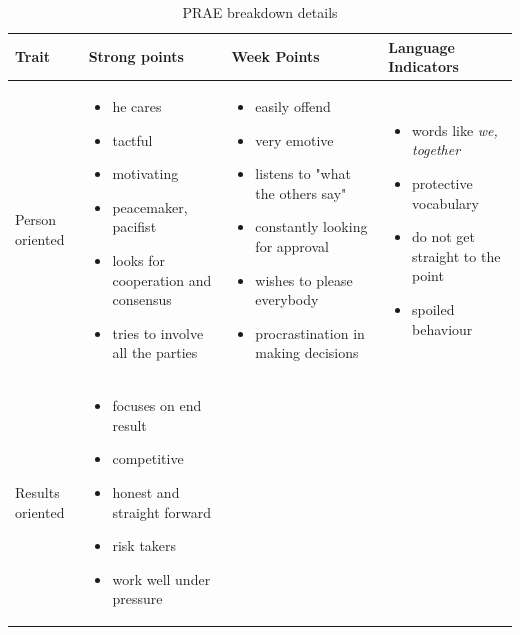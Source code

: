 \begin{table}[h]
  \centering
  \caption{PRAE breakdown details}
  \setlength\tabcolsep{3.8pt}
  \setlength\extrarowheight{1pt}
    \begin{tabular}{p{}p{}p{}p{}}
    \toprule
    Trait & Strong points & Week Points & Language Indicators \\ \midrule
    
    Person oriented 
     &
      \begin{itemize}
      \item he cares
      \item tactful
      \item motivating
      \item peacemaker, pacifist
      \item looks for cooperation and consensus
      \item tries to involve all the parties
      \end{itemize}
     & 
      \begin{itemize}
      \item easily offend
      \item very emotive
      \item listens to "what the others say"
      \item constantly looking for approval
      \item wishes to please everybody
      \item procrastination in making decisions
      \end{itemize}
     & 
      \begin{itemize}
      \item words like \textit{we, together}
      \item protective vocabulary
      \item do not get straight to the point
      \item spoiled behaviour
      \end{itemize}
     \\ \midrule
    Results oriented
     &
      \begin{itemize}
       \item focuses on end result
       \item competitive
       \item honest and straight forward
       \item risk takers
       \item work well under pressure

\end{itemize}
\end{tabular}
\end{table}
